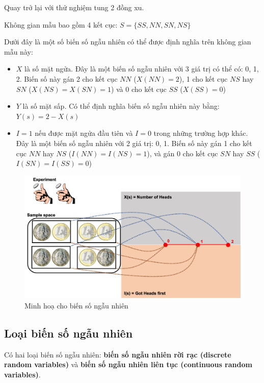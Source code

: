 \documentclass[
]{book}
\begin{document}
Quay trở lại với thử nghiệm tung 2 đồng xu.

Không gian mẫu bao gồm 4 kết cục: \(S = \{SS, NN, SN, NS\}\)

Dưới đây là một số biến số ngẫu nhiên có thể được định nghĩa trên không gian mẫu này:

\begin{itemize}
\item
  \(X\) là số mặt ngửa. Đây là một biến số ngẫu nhiên với 3 giá trị có thể có: 0, 1, 2. Biến số này gán 2 cho kết cục \(NN\) (\(X(NN) = 2\)), 1 cho kết cục \(NS\) hay \(SN\) (\(X(NS) = X(SN) = 1\)) và 0 cho kết cục \(SS\) (\(X(SS) = 0\))
\item
  \(Y\) là số mặt sấp. Có thể định nghĩa biến số ngẫu nhiên này bằng: \(Y(s) = 2 - X(s)\)
\item
  \(I = 1\) nếu được mặt ngửa đầu tiên và \(I = 0\) trong những trường hợp khác. Đây là một biến số ngẫu nhiên với 2 giá trị: 0, 1. Biến số này gán 1 cho kết cục \(NN\) hay \(NS\) (\(I(NN) = I(NS) = 1\)), và gán 0 cho kết cục \(SN\) hay \(SS\) (\(I(SN) = I(SS) = 0\))
\end{itemize}

\begin{figure}
\includegraphics[width=25.58in]{figures/Picture06} \caption{Minh hoạ cho biến số ngẫu nhiên}\label{fig:unnamed-chunk-2}
\end{figure}

\hypertarget{loux1ea1i-biux1ebfn-sux1ed1-ngux1eabu-nhiuxean}{%
\subsection{Loại biến số ngẫu nhiên}\label{loux1ea1i-biux1ebfn-sux1ed1-ngux1eabu-nhiuxean}}

Có hai loại biến số ngẫu nhiên: \textbf{biến số ngẫu nhiên rời rạc (discrete random variables)} và \textbf{biến số ngẫu nhiên liên tục (continuous random variables)}.
\end{document}
